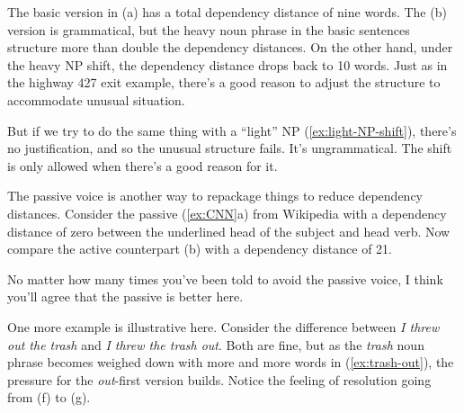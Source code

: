 The basic version in (a) has a total dependency distance of nine words. The (b) version is grammatical, but the heavy noun phrase in the basic sentences structure more than double the dependency distances. On the other hand, under the heavy NP shift, the dependency distance drops back to 10 words. Just as in the highway 427 exit example, there's a good reason to adjust the structure to accommodate unusual situation.

But if we try to do the same thing with a ``light'' NP (\ref{ex:light-NP-shift}), there's no justification, and so the unusual structure fails. It's ungrammatical. The shift is only allowed when there's a good reason for it.

\label{ex:light-NP-shift}\z

The passive voice is another way to repackage things to reduce dependency distances. Consider the passive (\ref{ex:CNN}a) from Wikipedia with a dependency distance of zero between the underlined head of the subject and head verb. Now compare the active counterpart (b) with a dependency distance of 21.

\ea\label{ex:CNN}
    \z
\z

\noindent No matter how many times you've been told to avoid the passive voice, I think you'll agree that the passive is better here.

One more example is illustrative here. Consider the difference between \textit{I threw out the trash} and \textit{I threw the trash out}. Both are fine, but as the \textit{trash} noun phrase becomes weighed down with more and more words in (\ref{ex:trash-out}), the pressure for the \textit{out}-first version builds. Notice the feeling of resolution going from (f) to (g).

\ea \label{ex:trash-out}
    \z
\z

